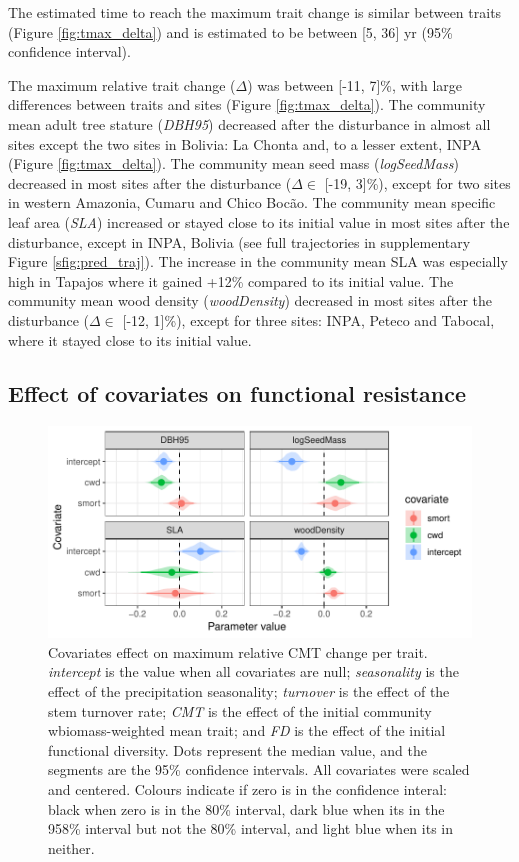 \documentclass[]{elsarticle} %
\makeatletter
\def\maxwidth{\ifdim\Gin@nat@width>\linewidth\linewidth
\else\Gin@nat@width\fi}
\let\Oldincludegraphics\includegraphics
\renewcommand{\includegraphics}[1]{\Oldincludegraphics[width=\maxwidth]{#1}}
\makeatother
\begin{document}
The estimated time to reach the maximum trait change is similar between
traits (Figure \ref{fig:tmax_delta}) and is estimated to be between
{[}5, 36{]} yr (95\% confidence interval).

The maximum relative trait change (\(\Delta\)) was between {[}-11,
7{]}\%, with large differences between traits and sites (Figure
\ref{fig:tmax_delta}). The community mean adult tree stature
(\emph{DBH95}) decreased after the disturbance in almost all sites
except the two sites in Bolivia: La Chonta and, to a lesser extent, INPA
(Figure \ref{fig:tmax_delta}). The community mean seed mass
(\emph{logSeedMass}) decreased in most sites after the disturbance
(\(\Delta \in\) {[}-19, 3{]}\%), except for two sites in western
Amazonia, Cumaru and Chico Bocão. The community mean specific leaf area
(\emph{SLA}) increased or stayed close to its initial value in most
sites after the disturbance, except in INPA, Bolivia (see full
trajectories in supplementary Figure \ref{sfig:pred_traj}). The increase
in the community mean SLA was especially high in Tapajos where it gained
+12\% compared to its initial value. The community mean wood density
(\emph{woodDensity}) decreased in most sites after the disturbance
(\(\Delta \in\) {[}-12, 1{]}\%), except for three sites: INPA, Peteco
and Tabocal, where it stayed close to its initial value.

\subsection{Effect of covariates on functional
resistance}\label{effect-of-covariates-on-functional-resistance}

\begin{figure}
\centering
\includegraphics{rticle_tmfo_functional_files/figure-latex/lambdas-1.pdf}
\caption{\label{fig:lambdas}Covariates effect on maximum relative CMT
change per trait. \emph{intercept} is the value when all covariates are
null; \emph{seasonality} is the effect of the precipitation seasonality;
\emph{turnover} is the effect of the stem turnover rate; \emph{CMT} is
the effect of the initial community wbiomass-weighted mean trait; and
\emph{FD} is the effect of the initial functional diversity. Dots
represent the median value, and the segments are the 95\% confidence
intervals. All covariates were scaled and centered. Colours indicate if
zero is in the confidence interal: black when zero is in the 80\%
interval, dark blue when its in the 958\% interval but not the 80\%
interval, and light blue when its in neither.}
\end{figure}
\end{document}
